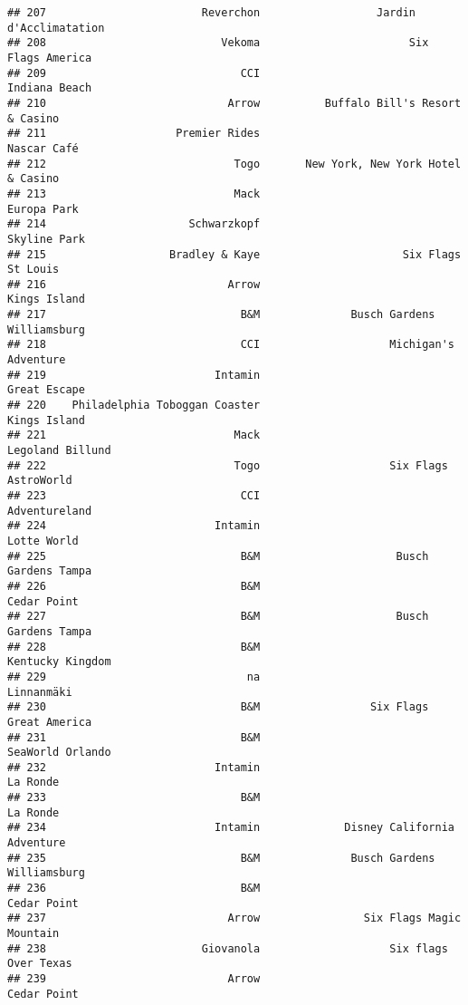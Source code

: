 \documentclass[
]{article}
\begin{document}
\begin{verbatim}
## 207                        Reverchon                  Jardin d'Acclimatation
## 208                           Vekoma                       Six Flags America
## 209                              CCI                           Indiana Beach
## 210                            Arrow          Buffalo Bill's Resort & Casino
## 211                    Premier Rides                             Nascar Café
## 212                             Togo       New York, New York Hotel & Casino
## 213                             Mack                             Europa Park
## 214                      Schwarzkopf                            Skyline Park
## 215                   Bradley & Kaye                      Six Flags St Louis
## 216                            Arrow                            Kings Island
## 217                              B&M              Busch Gardens Williamsburg
## 218                              CCI                    Michigan's Adventure
## 219                          Intamin                            Great Escape
## 220    Philadelphia Toboggan Coaster                            Kings Island
## 221                             Mack                        Legoland Billund
## 222                             Togo                    Six Flags AstroWorld
## 223                              CCI                           Adventureland
## 224                          Intamin                             Lotte World
## 225                              B&M                     Busch Gardens Tampa
## 226                              B&M                             Cedar Point
## 227                              B&M                     Busch Gardens Tampa
## 228                              B&M                        Kentucky Kingdom
## 229                               na                              Linnanmäki
## 230                              B&M                 Six Flags Great America
## 231                              B&M                        SeaWorld Orlando
## 232                          Intamin                                La Ronde
## 233                              B&M                                La Ronde
## 234                          Intamin             Disney California Adventure
## 235                              B&M              Busch Gardens Williamsburg
## 236                              B&M                             Cedar Point
## 237                            Arrow                Six Flags Magic Mountain
## 238                        Giovanola                    Six flags Over Texas
## 239                            Arrow                             Cedar Point

\end{verbatim}
\end{document}
